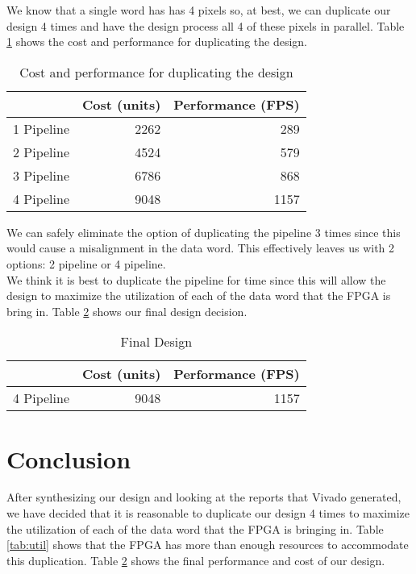 \documentclass[12pt]{article}
\begin{document}
We know that a single word has has 4 pixels so, at best, we can duplicate our design 4 times and have the design process all 4 of these pixels in parallel. Table \ref{tab:more} shows the cost and performance for duplicating the design.

\begin{table}[htbp]
  \centering
  \caption{Cost and performance for duplicating the design}
    \begin{tabular}{rrr}
    \toprule
          & Cost (units) & Performance (FPS) \\
    \midrule
    1 Pipeline & 2262  & 289 \\
    2 Pipeline & 4524  & 579 \\
    3 Pipeline & 6786  & 868 \\
    4 Pipeline & 9048  & 1157 \\
    \bottomrule
    \end{tabular}%
  \label{tab:more}%
\end{table}%


We can safely eliminate the option of duplicating the pipeline 3 times since this would cause a misalignment in the data word. This effectively leaves us with 2 options: 2 pipeline or 4 pipeline. \\

We think it is best to duplicate the pipeline for time since this will allow the design to maximize the utilization of each of the data word that the FPGA is bring in. Table \ref{tab:final} shows our final design decision. 

\begin{table}[htbp]
  \centering
  \caption{Final Design}
    \begin{tabular}{rrr}
    \toprule
          & Cost (units) & Performance (FPS) \\
    \midrule
    4 Pipeline & 9048  & 1157 \\
    \bottomrule
    \end{tabular}%
  \label{tab:final}%
\end{table}%

\section{Conclusion}
After synthesizing our design and looking at the reports that Vivado generated, we have decided that it is reasonable to duplicate our design 4 times to maximize the utilization of each of the data word that the FPGA is bringing in. Table \ref{tab:util} shows that the FPGA has more than enough resources to accommodate this duplication. Table \ref{tab:final} shows the final performance and cost of our design.  
\end{document}
